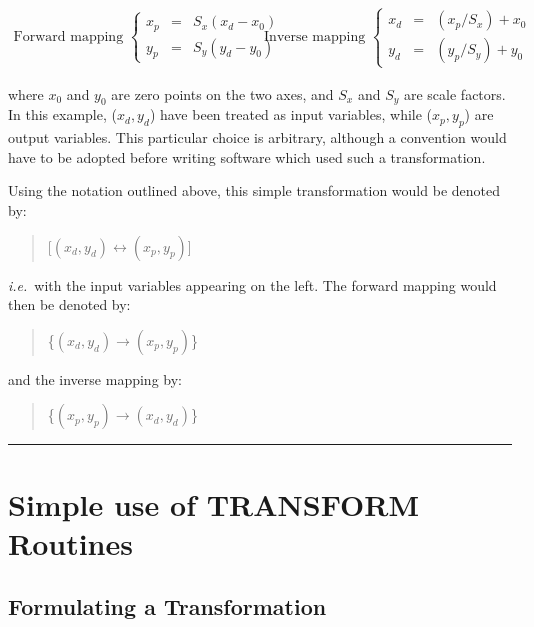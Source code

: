 \documentclass[twoside,11pt]{article}
\newcommand{\xlabel}[1]{}
\newcommand{\exampledone}[0]{\begin{center} \rule{6em}{0.2mm} \end{center}}
\begin{document}
\begin{equation}
\begin{array}{cc}
\mbox{Forward mapping } \left\{
\begin{array}{lll}
x_p & = & S_x(x_d-x_0) \\
y_p & = & S_y(y_d-y_0)
\end{array} \right.
&
\mbox{Inverse mapping } \left\{
\begin{array}{lll}
x_d & = & (x_p/S_x)+x_0 \\
y_d & = & (y_p/S_y)+y_0
\end{array} \right.
\end{array}
\end{equation}

where \mbox{$x_0$} and \mbox{$y_0$} are zero points on the two axes, and
\mbox{$S_x$} and \mbox{$S_y$} are scale factors. 
In this example, \mbox{($x_d,y_d$)} have been treated as input variables,
while \mbox{($x_p,y_p$)} are output variables. 
This particular choice is arbitrary, although a convention would have to be
adopted before writing software which used such a transformation. 

Using the notation outlined above, this simple transformation would be
denoted by:
\begin{quote}
\begin{center}
\mbox{[$(x_d,y_d) \leftrightarrow (x_p,y_p)$]}
\end{center}
\end{quote}
\emph{i.e.}\ with the input variables appearing on the left. 
The forward mapping would then be denoted by:
\begin{quote}
\begin{center}
\mbox{\{$(x_d,y_d) \rightarrow (x_p,y_p)$\}}
\end{center}
\end{quote}
and the inverse mapping by:
\begin{quote}
\begin{center}
\mbox{\{$(x_p,y_p) \rightarrow (x_d,y_d)$\}}
\end{center}
\end{quote}
\exampledone


\section{\xlabel{simple_use_of_transform_routines}Simple use of TRANSFORM Routines}


\subsection{\xlabel{formulating_a_transformation}Formulating a Transformation}
\end{document}
